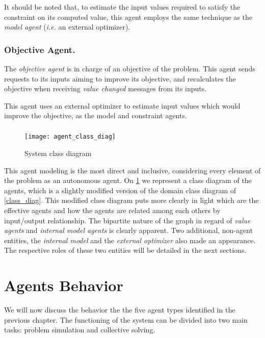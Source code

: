 It should be noted that, to estimate the input values required to satisfy the constraint on its computed value, this agent employs the same technique as the \emph{model agent} (\textit{i.e.} an external optimizer).

\subsection{Objective Agent.}
The  \emph{objective agent} is in charge of an objective of the problem. This agent sends requests to its inputs aiming to improve its objective, and recalculates the objective when receiving  \emph{value changed} messages from its inputs.

This agent uses an external optimizer to estimate input values which would improve the objective, as the model and constraint agents.

\paragraph*{}

\begin{figure}
\texttt{[image: agent\_class\_diag]}
\caption{System class diagram}\label{SMA_class_diagram}
\end{figure}

This agent modeling is the most direct and inclusive, considering every element of the problem as an autonomous agent. On \figurename{} \ref{SMA_class_diagram} we represent a class diagram of the agents, which is a slightly modified version of the domain class diagram of \figurename{} \ref{class_diag}. This modified class diagram puts more clearly in light which are the effective agents and how the agents are related among each others by input/output relationship. The bipartite nature of the graph in regard of \emph{value agents} and \emph{internal model agents} is clearly apparent. Two additional, non-agent entities, the  \emph{internal model} and the \emph{external optimizer} also made an appearance. The respective roles of these two entities will be detailed in the next sections.

\chapter{Agents Behavior}

We will now discuss the behavior the the five agent types identified in the previous chapter. The functioning of the system can be divided into two main tasks: problem simulation and collective solving.

